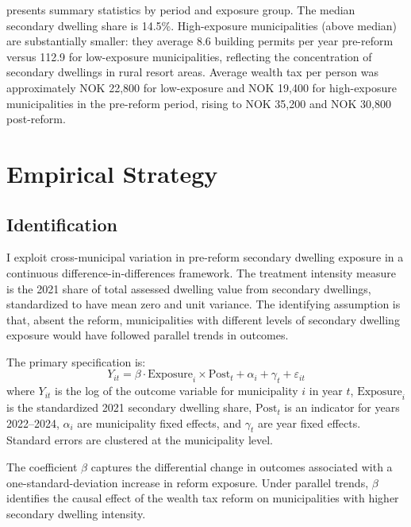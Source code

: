 \documentclass[12pt]{article}
\begin{document}
 presents summary statistics by period and exposure group. The median secondary dwelling share is 14.5\%. High-exposure municipalities (above median) are substantially smaller: they average 8.6 building permits per year pre-reform versus 112.9 for low-exposure municipalities, reflecting the concentration of secondary dwellings in rural resort areas. Average wealth tax per person was approximately NOK 22,800 for low-exposure and NOK 19,400 for high-exposure municipalities in the pre-reform period, rising to NOK 35,200 and NOK 30,800 post-reform.



\section{Empirical Strategy}

\subsection{Identification}

I exploit cross-municipal variation in pre-reform secondary dwelling exposure in a continuous difference-in-differences framework. The treatment intensity measure is the 2021 share of total assessed dwelling value from secondary dwellings, standardized to have mean zero and unit variance. The identifying assumption is that, absent the reform, municipalities with different levels of secondary dwelling exposure would have followed parallel trends in outcomes.

The primary specification is:
\begin{equation}
Y_{it} = \beta \cdot \text{Exposure}_i \times \text{Post}_t + \alpha_i + \gamma_t + \varepsilon_{it}
\label{eq:main}
\end{equation}
where $Y_{it}$ is the log of the outcome variable for municipality $i$ in year $t$, $\text{Exposure}_i$ is the standardized 2021 secondary dwelling share, $\text{Post}_t$ is an indicator for years 2022--2024, $\alpha_i$ are municipality fixed effects, and $\gamma_t$ are year fixed effects. Standard errors are clustered at the municipality level.

The coefficient $\beta$ captures the differential change in outcomes associated with a one-standard-deviation increase in reform exposure. Under parallel trends, $\beta$ identifies the causal effect of the wealth tax reform on municipalities with higher secondary dwelling intensity.
\end{document}
